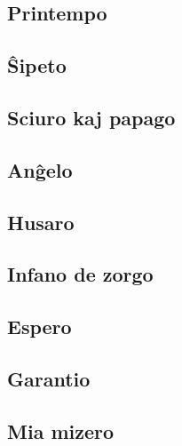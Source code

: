 \documentclass[a5paper,11pt,openany,twoside,leqno]{book}
\begin{document}

\subsection{Printempo}
\label{printempo}


\newpage %

\subsection{\^Sipeto}
\label{sxipeto}


\subsection{Sciuro kaj papago}
\label{sciuro}


\subsection{An\^gelo}
\label{angxelo}


\vspace*{-5ex} %

\subsection{Husaro}
\label{husaro}


\subsection{Infano de zorgo}
\label{infano}


\subsection{Espero}
\label{espero}


\subsection{Garantio}
\label{garantio}


\newpage %


\subsection{Mia mizero}
\label{mizero}

\end{document}
